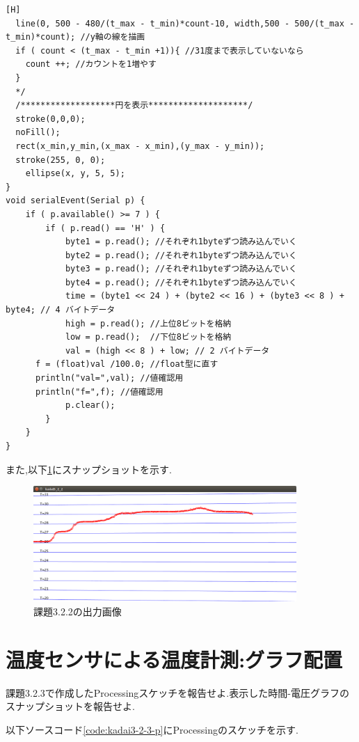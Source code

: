\documentclass{jarticle}
\begin{document}
\begin{lstlisting}[caption = 課題3.2.2(Processing),label=code:kadai3-2-2-p][H]
  line(0, 500 - 480/(t_max - t_min)*count-10, width,500 - 500/(t_max - t_min)*count); //y軸の線を描画
  if ( count < (t_max - t_min +1)){ //31度まで表示していないなら
    count ++; //カウントを1増やす
  }
  */
  /*******************円を表示********************/
  stroke(0,0,0);
  noFill();
  rect(x_min,y_min,(x_max - x_min),(y_max - y_min));
  stroke(255, 0, 0);
	ellipse(x, y, 5, 5);
}
void serialEvent(Serial p) {
	if ( p.available() >= 7 ) {
		if ( p.read() == 'H' ) {
			byte1 = p.read(); //それぞれ1byteずつ読み込んでいく
			byte2 = p.read(); //それぞれ1byteずつ読み込んでいく
			byte3 = p.read(); //それぞれ1byteずつ読み込んでいく
			byte4 = p.read(); //それぞれ1byteずつ読み込んでいく
			time = (byte1 << 24 ) + (byte2 << 16 ) + (byte3 << 8 ) + byte4; // 4 バイトデータ
			high = p.read(); //上位8ビットを格納
			low = p.read();  //下位8ビットを格納
			val = (high << 8 ) + low; // 2 バイトデータ
      f = (float)val /100.0; //float型に直す
      println("val=",val); //値確認用
      println("f=",f); //値確認用
			p.clear();
		}
	}
}
\end{lstlisting}
また,以下\ref{fig:kadai3-2-2}にスナップショットを示す.

\begin{figure}[H]
\begin{center}
\includegraphics[width=10.0cm]{images/kadai3-2-2.png}
\caption{課題3.2.2の出力画像}
\label{fig:kadai3-2-2}
\end{center}
\end{figure}

\section{温度センサによる温度計測:グラフ配置}
課題3.2.3で作成したProcessingスケッチを報告せよ.表示した時間-電圧グラフのスナップショットを報告せよ.

以下ソースコード\ref{code:kadai3-2-3-p}にProcessingのスケッチを示す.
\end{document}
